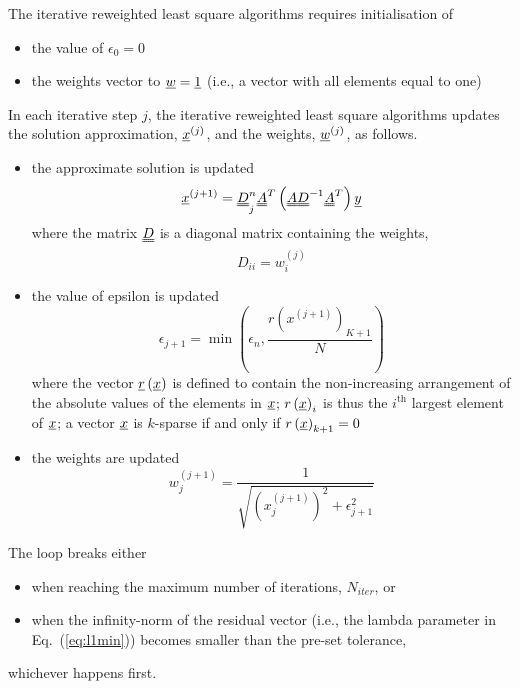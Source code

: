 \documentclass[11pt]{article} %
\begin{document}
The iterative reweighted least square algorithms requires initialisation of
\begin{itemize}
\item the value of $\epsilon_0 = 0$
\item the weights vector to $\uline{w} = \uline{1}$ (i.e., a vector with all elements equal to one)
\end{itemize}
In each iterative step $j$, the iterative reweighted least square algorithms updates the solution approximation, $\uline{x}^{(j)}$, and the weights, $\uline{w}^{(j)}$, as follows.
\begin{itemize}
\item the approximate solution is updated
\begin{equation}
\uline{x}^{(j+1)} = \uuline{D}_j^n \uuline{A}^T\left(\uuline{A} \uuline{D}^{-1} \uuline{A}^T\right) \uline{y}
\end{equation}
where the matrix $\uuline{D}$ is a diagonal matrix containing the weights,
\begin{equation}
D_{ii} = w_i^{(j)}
\end{equation}
\item the value of epsilon is updated
\begin{equation}
\epsilon_{j+1} =  \min\left(\epsilon_n, \frac{r\left(x^{(j+1)}\right)_{K+1}}{N}\right)
\end{equation}
where the vector $\uline{r}\left(\uline{x}\right)$ is defined to contain the non-increasing arrangement of the absolute values of the elements in $\uline{x}$; $r\left(\uline{x}\right)_i$ is thus the $i^{\text{th}}$ largest element of $\uline{x}$; a vector $\uline{x}$ is $k$-sparse if and only if $r\left(\uline{x}\right)_{k+1} = 0$
\item the weights are updated
\begin{equation}
w_j^{(j+1)} = \frac{1}{\sqrt{\left(x_j^{(j+1)}\right)^2 + \epsilon_{j+1}^2}}
\end{equation}
\end{itemize}


The loop breaks either
\begin{itemize}
\item when reaching the maximum number of iterations, $N_{iter}$, or
\item when the infinity-norm of the residual vector (i.e., the lambda parameter in Eq.~(\ref{eq:l1min})) becomes smaller than the pre-set tolerance,
\end{itemize}
whichever happens first.
\end{document}
